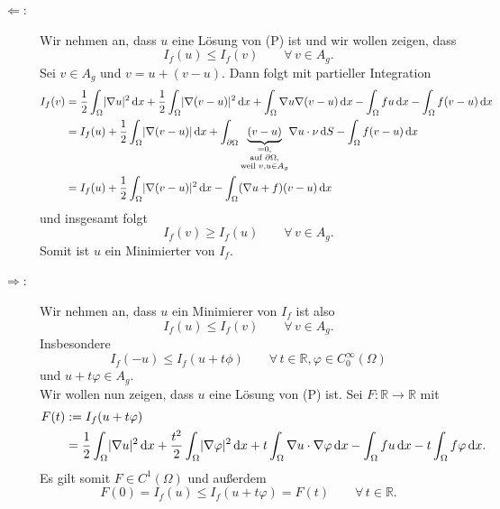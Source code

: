 \begin{beweis}
	\begin{description}
		\item[$\Leftarrow $:] Wir nehmen an, dass $u$ eine Lösung von (P) ist und wir wollen zeigen, dass 
		\[
			I_f(u) \leq I_f(v) \qquad \forall\,  v \in A_g .
		\] 
		Sei $v \in A_g$ und $v = u + (v-u)$. Dann folgt mit partieller Integration
		\begin{align*}
			I_f(v) &= \frac{1}{2} \int_{\Omega}^{} \lvert \nabla  u\rvert^2 \,\mathrm{d}x + \frac{1}{2} \int_{ \Omega}^{} \lvert  \nabla (v-u)\rvert^2 \,\mathrm{d}x 
			+ \int_{ \Omega}^{}  \nabla u  \nabla (v-u) \,\mathrm{d}x - \int_{\Omega}^{}fu \,\mathrm{d}x - \int_{\Omega}^{}f(v-u) \,\mathrm{d}x \\
			&= I_f(u) + \frac{1}{2} \int_{\Omega}^{} \lvert  \nabla (v-u)\rvert \,\mathrm{d}x 
			+ \int_{\partial \Omega}^{} \underset{\substack{=0, \\ \text{auf } \partial \Omega, \\\text{weil }v,u \in A_g}}{\underbrace{(v-u)}} 
			\nabla u \cdot \nu \,\mathrm{d}S - \int_{\Omega}^{}f(v-u) \,\mathrm{d}x \\
			&= I_f(u) + \frac{1}{2} \int_{\Omega}^{} \lvert  \nabla (v-u)\rvert^2 \,\mathrm{d}x - \int_{\Omega}^{} ( \nabla u + f)(v-u) \,\mathrm{d}x
		\end{align*}
		und insgesamt folgt 
		\[
			I_f(v) \geq I_f(u) \qquad \forall\, v \in A_g.
		\]
		Somit ist $u$ ein Minimierter von $I_f$.
		\item[$\Rightarrow $:] Wir nehmen an, dass $u$ ein Minimierer von $I_f$ ist also 
		\[
			I_f(u) \leq I_f(v) \qquad \forall\, v \in A_g.
		\]
		Insbesondere 
		\[
			I_f(-u) \leq I_f(u + t \phi) \qquad \forall\,  t \in \mathbb{R}, \varphi \in C^{\infty}_0(\Omega)
		\]
		und $u + t \varphi \in A_g$. \\
		Wir wollen nun zeigen, dass $u$ eine Lösung von (P) ist. Sei $F: \mathbb{R} \to \mathbb{R}$ mit
		\begin{align*}
			F(t) &:= I_f(u + t \varphi) \\ &= \frac{1}{2} \int_{\Omega}^{} \lvert  \nabla u\rvert^2 \,\mathrm{d}x 
			+ \frac{t^2}{2} \int_{\Omega} \lvert \nabla \varphi\rvert^2 \,\mathrm{d}x + t \int_{\Omega}^{}  \nabla u \cdot  \nabla \varphi \,\mathrm{d}x
			- \int_{\Omega}^{} fu \,\mathrm{d}x - t \int_{\Omega}^{}f \varphi \,\mathrm{d}x.
		\end{align*}
		Es gilt somit $F \in C^1(\Omega)$ und außerdem
		\[
			F(0) = I_f(u) \leq I_f(u + t \varphi) = F(t) \qquad \forall\, t \in \mathbb{R}.
\]
\end{description}
\end{beweis}

